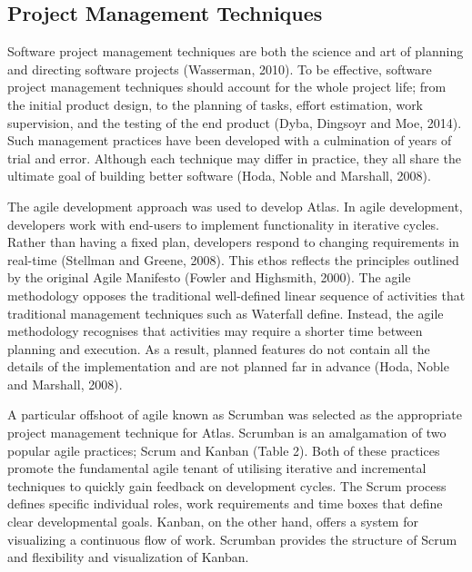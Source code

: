 \documentclass{article}
\begin{document}
\subsection{Project Management Techniques}

Software project management techniques are both the science and art of planning and directing software projects (Wasserman, 2010). To be effective, software project management techniques should account for the whole project life; from the initial product design, to the planning of tasks, effort estimation, work supervision, and the testing of the end product (Dyba, Dingsoyr and Moe, 2014). Such management practices have been developed with a culmination of years of trial and error. Although each technique may differ in practice, they all share the ultimate goal of building better software (Hoda, Noble and Marshall, 2008).

The agile development approach was used to develop Atlas. In agile development, developers work with end-users to implement functionality in iterative cycles. Rather than having a fixed plan,  developers respond to changing requirements in real-time (Stellman and Greene, 2008). This ethos reflects the principles outlined by the original Agile Manifesto (Fowler and Highsmith, 2000). The agile methodology opposes the traditional well-defined linear sequence of activities that traditional management techniques such as Waterfall define. Instead, the agile methodology recognises that activities may require a shorter time between planning and execution. As a result, planned features do not contain all the details of the implementation and are not planned far in advance (Hoda, Noble and Marshall, 2008). 

A particular offshoot of agile known as Scrumban was selected as the appropriate project management technique for Atlas. Scrumban is an amalgamation of two popular agile practices; Scrum and Kanban (Table 2). Both of these practices promote the fundamental agile tenant of utilising iterative and incremental techniques to quickly gain feedback on development cycles. The Scrum process defines specific individual roles, work requirements and time boxes that define clear developmental goals. Kanban, on the other hand, offers a system for visualizing a continuous flow of work. Scrumban provides the structure of Scrum and flexibility and visualization of Kanban. 
\end{document}
